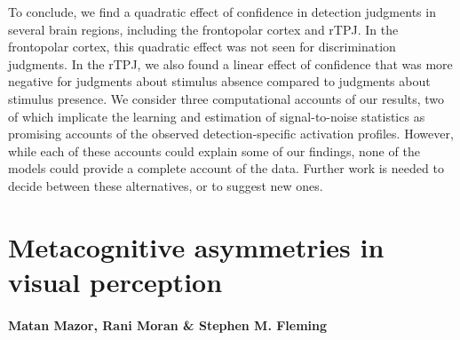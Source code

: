 \documentclass[12pt,twoside]{reedthesis}
\begin{document}
To conclude, we find a quadratic effect of confidence in detection judgments in several brain regions, including the frontopolar cortex and rTPJ. In the frontopolar cortex, this quadratic effect was not seen for discrimination judgments. In the rTPJ, we also found a linear effect of confidence that was more negative for judgments about stimulus absence compared to judgments about stimulus presence. We consider three computational accounts of our results, two of which implicate the learning and estimation of signal-to-noise statistics as promising accounts of the observed detection-specific activation profiles. However, while each of these accounts could explain some of our findings, none of the models could provide a complete account of the data. Further work is needed to decide between these alternatives, or to suggest new ones.

\hypertarget{ch:asymmetry}{%
\chapter{Metacognitive asymmetries in visual perception}\label{ch:asymmetry}}

\hypertarget{matan-mazor-rani-moran-stephen-m.-fleming}{%
\subsubsection*{Matan Mazor, Rani Moran \& Stephen M. Fleming}\label{matan-mazor-rani-moran-stephen-m.-fleming}}
\end{document}
